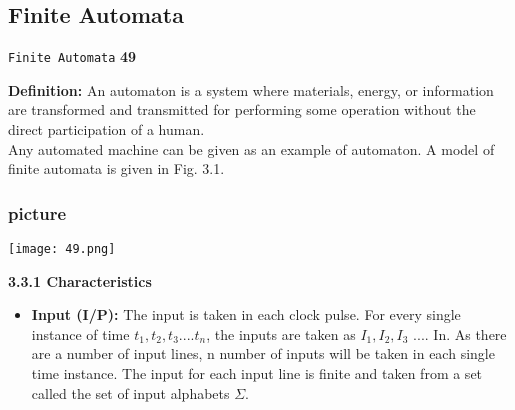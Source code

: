 \documentclass[8pt]{beamer}
\begin{document}
\begin{frame}
\section*{Finite Automata}
\begin{flushright}
 \texttt{Finite Automata} \hspace*{1cm} \textbf{49}
\end{flushright}

\vspace*{0.2cm}
\begin{multicols}{2}
\textbf{Definition:} An automaton is a system where materials,
energy, or information are transformed and transmitted
for performing some operation without the direct
participation of a human.\\
\hspace*{0.5cm} Any automated machine can be given as an example
of automaton. A model of finite automata is given in
Fig. 3.1.\\

\vspace*{0.2cm}
\begin{center}
\section{picture}
\texttt{[image: 49.png]}
\end{center}
\end{multicols}

\large{
\textbf{3.3.1 Characteristics}\\
}

\vspace*{0.2cm}
\small{
\begin{itemize}
  \item \textbf{Input (I/P):} The input is taken in each clock pulse. For every single instance of time $t_{1}, t_{2}, t_{3} .... t_{n}$,
the inputs are taken as $I_{1}, I_{2}, I_{3}$ .... In. As there are a number of input lines, n number of inputs will
be taken in each single time instance. The input for each input line is finite and taken from a set
called the set of input alphabets $\Sigma$.\\
\end{itemize}
}
\end{frame}
\end{document}
